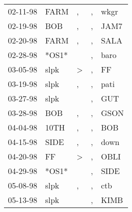 \begin{supertabular}{p{0.07\textwidth}p{0.06\textwidth}p{0.02\textwidth}p{0.02\textwidth}p{0.06\textwidth}}
          02-11-98\textsuperscript{} &           FARM\textsuperscript{} &                , &                , &           wkgr\textsuperscript{} \\
          02-19-98\textsuperscript{} &            BOB\textsuperscript{} &                , &                , &           JAM7\textsuperscript{} \\
          02-20-98\textsuperscript{} &           FARM\textsuperscript{} &                , &                , &           SALA\textsuperscript{} \\
          02-28-98\textsuperscript{} &                            *OS1* &                  &                , &           baro\textsuperscript{} \\
          03-05-98\textsuperscript{} &           slpk\textsuperscript{} &     \textgreater &                , &             FF\textsuperscript{} \\
          03-19-98\textsuperscript{} &           slpk\textsuperscript{} &                , &                , &           pati\textsuperscript{} \\
          03-27-98\textsuperscript{} &           slpk\textsuperscript{} &                  &                , &            GUT\textsuperscript{} \\
          03-28-98\textsuperscript{} &            BOB\textsuperscript{} &                , &                , &           GSON\textsuperscript{} \\
          04-04-98\textsuperscript{} &           10TH\textsuperscript{} &                , &                , &            BOB\textsuperscript{} \\
          04-15-98\textsuperscript{} &           SIDE\textsuperscript{} &                , &                , &           down\textsuperscript{} \\
          04-20-98\textsuperscript{} &             FF\textsuperscript{} &     \textgreater &                , &           OBLI\textsuperscript{} \\
          04-29-98\textsuperscript{} &                            *OS1* &                  &                , &           SIDE\textsuperscript{} \\
          05-08-98\textsuperscript{} &           slpk\textsuperscript{} &                , &                , &            ctb\textsuperscript{} \\
          05-13-98\textsuperscript{} &           slpk\textsuperscript{} &                  &                , &           KIMB\textsuperscript{} \\

\end{supertabular}
